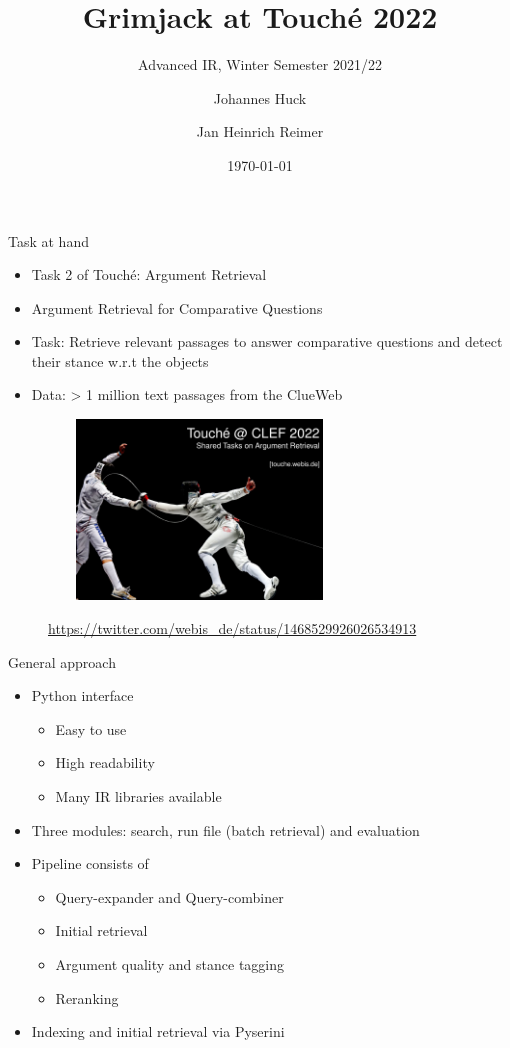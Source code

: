 \documentclass[english]{mlutalk}
\title{Grimjack at Touché 2022}
\subtitle{Advanced IR, Winter Semester 2021/22}
\author{Johannes Huck \and Jan Heinrich Reimer}
\institute{Martin Luther University Halle-Wittenberg}
\date{\today}
\begin{document}
\titleframe

\begin{frame}{Task at hand}  
  \begin{itemize}
    \item Task 2 of Touché: Argument Retrieval
    \item Argument Retrieval for Comparative Questions
    \item Task: Retrieve relevant passages to answer comparative questions and detect their stance w.r.t the objects
    \item Data: > 1 million text passages from the ClueWeb
  \end{itemize}
  \begin{figure}
      \centering
      \includegraphics[height=4.8cm, width=8cm]{figures/touche}\\
      \begin{tiny}
        \url{https://twitter.com/webis_de/status/1468529926026534913}
      \end{tiny}
  \end{figure}
\end{frame}

\begin{frame}{General approach}
  \begin{itemize}
    \item Python interface
    \begin{itemize}
        \item Easy to use
        \item High readability
        \item Many IR libraries available
    \end{itemize}
    \item Three modules: search, run file (batch retrieval) and evaluation
    \item Pipeline consists of
    \begin{itemize}
        \item Query-expander and Query-combiner
        \item Initial retrieval
        \item Argument quality and stance tagging
        \item Reranking
    \end{itemize}
    \item Indexing and initial retrieval via Pyserini~\cite{LinMLYPN2021}
  \end{itemize}
\end{frame}
\end{document}
